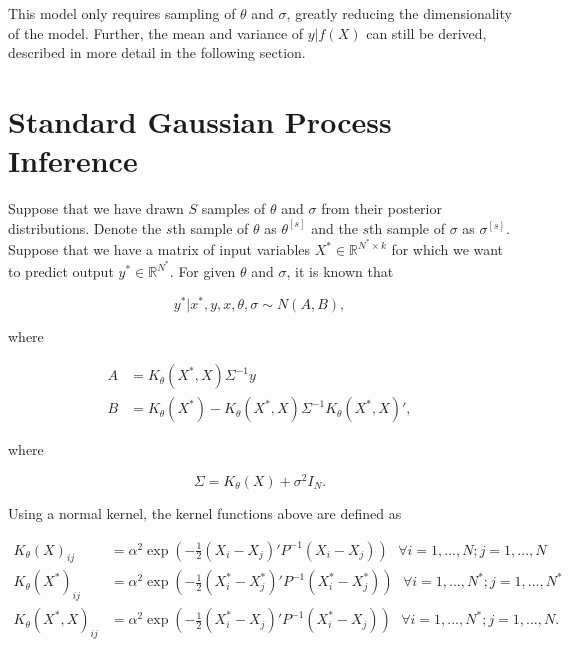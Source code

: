\documentclass{article}
\newcommand{\RR}{\mathbb{R}}
\newcommand{\sample}[1]{{#1}^{[s]}}
\begin{document}
This model only requires sampling of $\theta$ and $\sigma$, greatly reducing the dimensionality of the model. Further, the mean and variance of $y|f(X)$ can still be derived, described in more detail in the following section.


\section{Standard Gaussian Process Inference}

\label{sec:inference}

Suppose that we have drawn $S$ samples of $\theta$ and $\sigma$ from their posterior distributions. Denote the $s$th sample of $\theta$ as $\sample{\theta}$ and the $s$th sample of $\sigma$ as $\sample{\sigma}$. Suppose that we have a matrix of input variables $X^*\in\RR^{N^*\times k}$ for which we want to predict output $y^*\in\RR^{N^*}$. For given $\theta$ and $\sigma$, it is known that

\begin{equation}
	y^*|x^*, y, x, \theta, \sigma \sim N(A, B),
\end{equation}

\noindent where

\begin{subequations}
\begin{align}
	A &= K_\theta(X^*, X) \Sigma^{-1} y\\
	B &= K_\theta(X^*) - K_\theta(X^*, X) \Sigma^{-1} K_\theta(X^*, X)',
\end{align}
\end{subequations}

\noindent where 

\begin{equation}
	\Sigma = K_\theta(X) + \sigma^2 I_N.
\end{equation}

\noindent Using a normal kernel, the kernel functions above are defined as

\begin{subequations}
\begin{align}
	K_\theta(X)_{ij} &= \alpha^2 \exp\left(-\frac12 (X_i - X_j)' P^{-1} (X_i - X_j)\right)\mbox{\ \ \ \ }\forall i=1,...,N; j=1,...,N\\
	K_\theta(X^*)_{ij} &= \alpha^2 \exp\left(-\frac12 (X^*_i - X^*_j)' P^{-1} (X^*_i - X^*_j)\right)\mbox{\ \ \ \ }\forall i=1,...,N^*; j=1,...,N^*\\
	K_\theta(X^*, X)_{ij} &= \alpha^2 \exp\left(-\frac12 (X^*_i - X_j)' P^{-1} (X^*_i - X_j)\right)\mbox{\ \ \ \ }\forall i=1,...,N^*; j=1,...,N.
\end{align}
\end{subequations}
\end{document}
